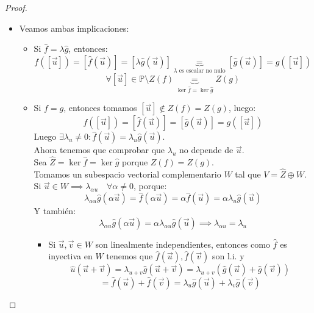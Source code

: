 \begin{proof}
\begin{itemize}
\begin{itemize}
            Luego, $[\hat{f}(\vec{u})] = [\lambda \vec{v}] = [\vec{v}]$, luego $f([\vec{u}]) = [\hat{f}(\vec{u})] = [\vec{v}]$.\\
            Por tanto, $f$ es sobreyectiva.
        \end{itemize}
        \item[3)] Veamos ambas implicaciones:
        \begin{itemize}
            \item[$\Leftarrow$)] Si $\hat{f} = \lambda \hat{g}$, entonces:
        \[
        f([\vec{u}]) = [\hat{f}(\vec{u})] = [\lambda \hat{g}(\vec{u})] \underbrace{=}_{\lambda \text{ es escalar no nulo}} [\hat{g}(\vec{u})] = g([\vec{u}])
        \]
        \[
        \forall [\vec{u}] \in \mathbb{P} \setminus Z(f) \underbrace{=}_{\ker\hat{f} = \ker\hat{g}} Z(g)
        \]
        \item[$\Rightarrow$)] Si $f = g$, entonces tomamos $[\vec{u}] \notin Z(f) = Z(g)$, luego:
        \[
        f([\vec{u}]) = [\hat{f}(\vec{u})] = [\hat{g}(\vec{u})] = g([\vec{u}])
        \]
        Luego $\exists \lambda_u \neq 0 : \hat{f}(\vec{u}) = \lambda_u \hat{g}(\vec{u})$.\\
        Ahora tenemos que comprobar que $\lambda_u$ no depende de $\vec{u}$.\\
        Sea $\hat{Z} = \ker \hat{f} = \ker \hat{g}$ porque $Z(f) = Z(g)$.\\
        Tomamos un subespacio vectorial complementario $W$ tal que $V = \hat{Z} \oplus W$.\\
        Si $\vec{u} \in W \implies \lambda_{\alpha u} \quad \forall \alpha \neq 0$, porque:
        \[
        \lambda_{\alpha u} \hat{g}(\alpha \vec{u}) = \hat{f}(\alpha \vec{u}) = \alpha \hat{f}(\vec{u}) = \alpha \lambda_u \hat{g}(\vec{u})
        \]
        Y también:
        \[
        \lambda_{\alpha u} \hat{g}(\alpha \vec{u}) = \alpha \lambda_{\alpha u} \hat{g}(\vec{u}) \implies \lambda_{\alpha u} = \lambda_u
        \]
        \begin{itemize}
            \item Si $\vec{u},\vec{v} \in W$ son linealmente independientes, entonces como $\hat{f}$ es inyectiva en $W$ tenemos que $\hat{f}(\vec{u}), \hat{f}(\vec{v})$ son l.i. y
            \[
                \hat{u}(\vec{u} + \vec{v}) = \lambda_{u+v} \hat{g}(\vec{u} + \vec{v}) = \lambda_{u+v} (\hat{g}(\vec{u}) + \hat{g}(\vec{v}))
            \]
            \[
                = \hat{f}(\vec{u}) + \hat{f}(\vec{v}) = \lambda_u \hat{g}(\vec{u}) + \lambda_v \hat{g}(\vec{v})
            \]

\end{itemize}
\end{itemize}
\end{itemize}
\end{proof}
